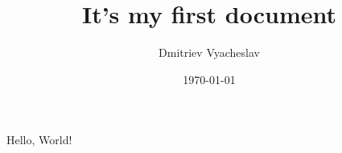 \documentclass[a4paper,12pt]{article}
\author{Dmitriev Vyacheslav}
\title{It's my first document}
\date{\today}
\begin{document}
\maketitle

Hello, World!
\end{document}
